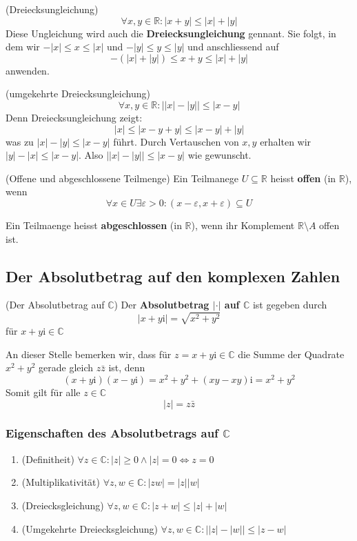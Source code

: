 \documentclass[../Analysis1_script.tex]{subfiles}
\begin{document}
\begin{corollary}{(Dreiecksungleichung)}
	\[\forall x, y \in \mathbb{R}: |x + y| \leq |x| + |y|\]
	Diese Ungleichung wird auch die \textbf{Dreiecksungleichung} gennant. Sie folgt, in dem wir $-|x| \leq x \leq |x|$ und $-|y| \leq y \leq |y|$ und anschliessend auf
	\[-(|x| + |y|) \leq x + y \leq |x| + |y|\]
	anwenden.
\end{corollary}

\begin{corollary}{(umgekehrte Dreiecksungleichung)}
	\[\forall x, y \in \mathbb{R}: \big||x| - |y|\big| \leq |x - y|\]
	Denn Dreiecksungleichung zeigt:
	\[|x| \leq |x - y + y| \leq |x - y| + |y|\]
	was zu $|x| - |y| \leq |x - y|$ führt. Durch Vertauschen von $x, y$ erhalten wir $|y| - |x| \leq |x - y|$. Also $\big||x| - |y|\big| \leq |x - y|$ wie gewunscht. 
\end{corollary}

\begin{definition}{(Offene und abgeschlossene Teilmenge)}
	Ein Teilmanege $U \subseteq \mathbb{R}$ heisst \textbf{offen} (in $\mathbb{R}$), wenn 
	\[\forall x \in U \exists \varepsilon > 0 : (x - \varepsilon, x + \varepsilon) \subseteq U\]
	
	Ein Teilmaenge heisst \textbf{abgeschlossen} (in $\mathbb{R}$), wenn ihr Komplement $\mathbb{R} \setminus A$ offen ist.
\end{definition}


\subsection{Der Absolutbetrag auf den komplexen Zahlen}

\begin{definition}{(Der Absolutbetrag auf $\mathbb{C}$)}
	Der \textbf{Absolutbetrag $|\cdot|$ auf $\mathbb{C}$} ist gegeben durch
	\[|x + y\mathrm{i}| = \sqrt{x^2 + y^2}\]
	für $x + y\mathrm{i} \in \mathbb{C}$
	
	An dieser Stelle bemerken wir, dass für $z = x + y\mathrm{i} \in \mathbb{C}$ die Summe der Quadrate $x^2 + y^2$ gerade gleich $z\bar{z}$ ist, denn
	\[(x + y\mathrm{i})(x - y\mathrm{i}) = x^2 + y^2 + (xy -xy)\mathrm{i} = x^2 + y^2\]
	Somit gilt für alle $z \in \mathbb{C}$ 
	\[|z| = z\bar{z}\]
\end{definition}

\subsubsection{Eigenschaften des Absolutbetrags auf $\mathbb{C}$}
	\begin{enumerate}
		\item{(Definitheit)} $\forall z \in \mathbb{C}: |z| \geq 0 \wedge |z| = 0 \iff z = 0$
		\item{(Multiplikativität)} $\forall z, w \in \mathbb{C} : |zw| = |z||w|$
		\item{(Dreiecksgleichung)} $\forall z, w \in \mathbb{C} : |z + w| \leq |z| + |w|$
		\item{(Umgekehrte Dreiecksgleichung)} $\forall z, w \in \mathbb{C} : \big||z| - |w|\big| \leq |z - w|$
	\end{enumerate}
	
\end{document}
